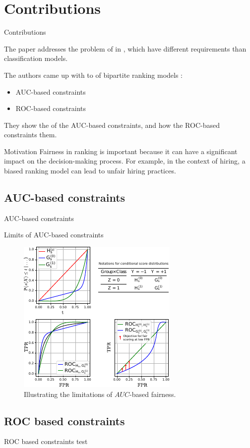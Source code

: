 \section{Contributions}
\begin{frame}{Contributions}

    The paper addresses the problem of  in , which have different requirements than classification models.
    
    The authors came up with  to  of bipartite ranking models :
  \begin{itemize}
      \item AUC-based constraints
      \item ROC-based constraints
  \end{itemize}
  
  They show the  of the AUC-based constraints, and how the ROC-based constraints  them.
\end{frame}

\begin{frame}{Motivation}
    Fairness in ranking is important because it can have a significant impact on the decision-making process. For example, in the context of hiring, a biased ranking model can lead to unfair hiring practices.
\end{frame}


\subsection{AUC-based constraints}
\begin{frame}{AUC-based constraints}

\end{frame}

\begin{frame}{Limits of AUC-based constraints}
    \begin{figure}[t]
        \centering
        \includegraphics[width=0.6\columnwidth]{images/original_paper/example_simple_dists_explained_with_table2.pdf}
        \caption{Illustrating the limitations of $AUC$-based fairness.}
        \label{fig:example-1}
    \end{figure}
\end{frame}

\subsection{ROC based constraints}
\begin{frame}{ROC based constraints}
    test
\end{frame}
